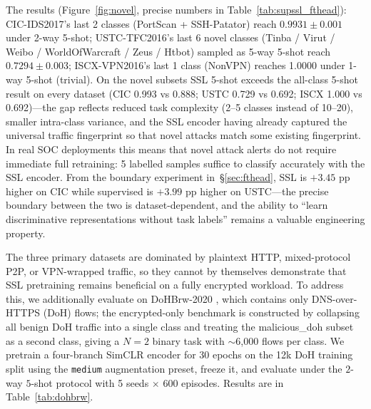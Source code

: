 \documentclass[sensors,article,submit,moreauthors]{Definitions/mdpi}
\begin{document}
The results (Figure~\ref{fig:novel}, precise numbers in Table~\ref{tab:supssl_fthead}): CIC-IDS2017's last 2 classes (PortScan + SSH-Patator) reach $0.9931 \pm 0.001$ under 2-way 5-shot; USTC-TFC2016's last 6 novel classes (Tinba / Virut / Weibo / WorldOfWarcraft / Zeus / Htbot) sampled as 5-way 5-shot reach $0.7294 \pm 0.003$; ISCX-VPN2016's last 1 class (NonVPN) reaches 1.0000 under 1-way 5-shot (trivial). On the novel subsets SSL 5-shot exceeds the all-class 5-shot result on every dataset (CIC 0.993 vs 0.888; USTC 0.729 vs 0.692; ISCX 1.000 vs 0.692)---the gap reflects reduced task complexity (2--5 classes instead of 10--20), smaller intra-class variance, and the SSL encoder having already captured the universal traffic fingerprint so that novel attacks match some existing fingerprint. In real SOC deployments this means that novel attack alerts do not require immediate full retraining: 5 labelled samples suffice to classify accurately with the SSL encoder. From the boundary experiment in~\S\ref{sec:fthead}, SSL is $+3.45$ pp higher on CIC while supervised is $+3.99$ pp higher on USTC---the precise boundary between the two is dataset-dependent, and the ability to ``learn discriminative representations without task labels'' remains a valuable engineering property.

The three primary datasets are dominated by plaintext HTTP, mixed-protocol P2P, or VPN-wrapped traffic, so they cannot by themselves demonstrate that SSL pretraining remains beneficial on a fully encrypted workload. To address this, we additionally evaluate on DoHBrw-2020 \cite{montazeri2021dohbrw}, which contains only DNS-over-HTTPS (DoH) flows; the encrypted-only benchmark is constructed by collapsing all benign DoH traffic into a single class and treating the malicious\_doh subset as a second class, giving a $N=2$ binary task with $\sim$6{,}000 flows per class. We pretrain a four-branch SimCLR encoder for 30 epochs on the 12k DoH training split using the \texttt{medium} augmentation preset, freeze it, and evaluate under the $2$-way $5$-shot protocol with 5 seeds $\times$ 600 episodes. Results are in Table~\ref{tab:dohbrw}.
\end{document}
